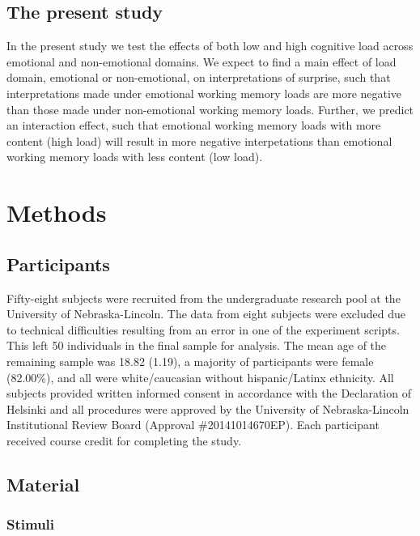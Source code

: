 \documentclass[man]{apa6}
\begin{document}
\hypertarget{the-present-study}{%
\subsection{The present study}\label{the-present-study}}

In the present study we test the effects of both low and high cognitive load across emotional and non-emotional domains. We expect to find a main effect of load domain, emotional or non-emotional, on interpretations of surprise, such that interpretations made under emotional working memory loads are more negative than those made under non-emotional working memory loads. Further, we predict an interaction effect, such that emotional working memory loads with more content (high load) will result in more negative interpetations than emotional working memory loads with less content (low load).

\hypertarget{methods}{%
\section{Methods}\label{methods}}

\hypertarget{participants}{%
\subsection{Participants}\label{participants}}

Fifty-eight subjects were recruited from the undergraduate research pool at the University of Nebraska-Lincoln. The data from eight subjects were excluded due to technical difficulties resulting from an error in one of the experiment scripts. This left 50 individuals in the final sample for analysis. The mean age of the remaining sample was 18.82 (1.19), a majority of participants were female (82.00\%), and all were white/caucasian without hispanic/Latinx ethnicity. All subjects provided written informed consent in accordance with the Declaration of Helsinki and all procedures were approved by the University of Nebraska-Lincoln Institutional Review Board (Approval \#20141014670EP). Each participant received course credit for completing the study.

\hypertarget{material}{%
\subsection{Material}\label{material}}

\hypertarget{stimuli}{%
\subsubsection{Stimuli}\label{stimuli}}
\end{document}
